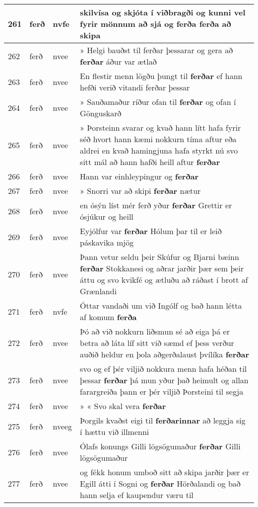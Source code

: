 \documentclass{article}
\begin{document}
\begin{longtable}{p{1cm}|p{1cm}|p{1cm}|p{13cm}}
\hline
261&ferð&nvfe&skilvísa og skjóta í viðbragði og kunni vel fyrir mönnum að sjá og \textbf{ferða} ferða að skipa\\
\hline
262&ferð&nvee&» Helgi bauðst til ferðar þessarar og gera að \textbf{ferðar} áður var ætlað\\
\hline
263&ferð&nvee&En flestir menn lögðu þungt til \textbf{ferðar} ef hann hefði verið vitandi ferðar þessar\\
\hline
264&ferð&nvee&» Sauðamaður ríður ofan til \textbf{ferðar} og ofan í Gönguskarð\\
\hline
265&ferð&nvee&» Þorsteinn svarar og kvað hann lítt hafa fyrir séð hvort hann kæmi nokkurn tíma aftur eða aldrei en kvað hamingjuna hafa styrkt nú svo sitt mál að hann hafði heill aftur \textbf{ferðar} \\
\hline
266&ferð&nvee&Hann var einhleypingur og \textbf{ferðar} \\
\hline
267&ferð&nvee&» Snorri var að skipi \textbf{ferðar} nætur\\
\hline
268&ferð&nvee&en ósýn líst mér ferð yður \textbf{ferðar} Grettir er ósjúkur og heill\\
\hline
269&ferð&nvee&Eyjólfur var \textbf{ferðar} Hólum þar til er leið páskavika mjög\\
\hline
270&ferð&nvee&Þann vetur seldu þeir Skúfur og Bjarni bæinn \textbf{ferðar} Stokkanesi og aðrar jarðir þær sem þeir áttu og svo kvikfé og ætluðu að ráðast í brott af Grænlandi\\
\hline
271&ferð&nvfe&Óttar vandaði um við Ingólf og bað hann létta af komum \textbf{ferða} \\
\hline
272&ferð&nvee&Þó að við nokkurn liðsmun sé að eiga þá er betra að láta líf sitt við sæmd ef þess verður auðið heldur en þola aðgerðalaust þvílíka \textbf{ferðar} \\
\hline
273&ferð&nvee&svo og ef þér viljið nokkura menn hafa héðan til þessar \textbf{ferðar} þá mun yður það heimult og allan farargreiða þann er þér viljið Þorsteini til segja\\
\hline
274&ferð&nvee&» « Svo skal vera \textbf{ferðar} \\
\hline
275&ferð&nveeg&Þorgils kvaðst eigi til \textbf{ferðarinnar} að leggja sig í hættu við illmenni\\
\hline
276&ferð&nvee&Ólafs konungs Gilli lögsögumaður \textbf{ferðar} Gilli lögsögumaður\\
\hline
277&ferð&nvee&og fékk honum umboð sitt að skipa jarðir þær er Egill átti í Sogni og \textbf{ferðar} Hörðalandi og bað hann selja ef kaupendur væru til\\

\end{longtable}
\end{document}
